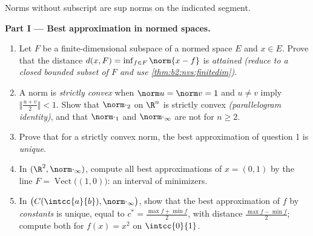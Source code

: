 \begin{problem}
\label{pb:b2:nvs:1}
Norms without subscript are sup norms on the indicated segment.

\medskip
\noindent\textbf{Part I --- Best approximation in normed
spaces.}
\begin{enumerate}
  \item Let $F$ be a finite-dimensional subspace of a normed
        space $E$ and $x \in E$. Prove that the distance $d(x,
        F) = \inf_{f \in F}\norm{x - f}$ is \emph{attained}
        \emph{(reduce to a closed bounded subset of $F$ and use
        \cref{thm:b2:nvs:finitedim})}.
  \item A norm is \emph{strictly convex} when $\norm u = \norm v
        = 1$ and $u \neq v$ imply $\bigl\Vert\frac{u +
        v}2\bigr\Vert < 1$. Show that $\norm\cdot_2$ on $\R^n$
        is strictly convex \emph{(parallelogram identity)}, and
        that $\norm\cdot_1$ and $\norm\cdot_\infty$ are not for
        $n \geq 2$.
  \item Prove that for a strictly convex norm, the best
        approximation of question 1 is \emph{unique}.
  \item In $(\R^2, \norm\cdot_\infty)$, compute all best
        approximations of $x = (0, 1)$ by the line $F =
        \operatorname{Vect}\bigl((1,0)\bigr)$: an interval of
        minimizers.
  \item In $\bigl(C(\intcc{a}{b}), \norm\cdot_\infty\bigr)$,
        show that the best approximation of $f$ by
        \emph{constants} is unique, equal to $c^* = \frac{\max f
        + \min f}{2}$, with distance $\frac{\max f - \min
        f}{2}$; compute both for $f(x) = x^2$ on
        $\intcc{0}{1}$.
\end{enumerate}


\end{problem}
